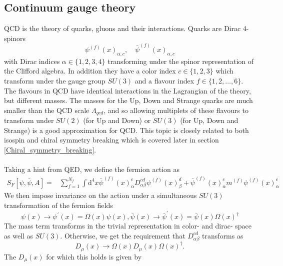 \documentclass[a4paper,10pt]{book}
\begin{document}
\subsection{Continuum gauge theory}
QCD is the theory of quarks, gluons and their interactions. Quarks are Dirac 4- spinors 
\begin{equation}
\psi^{(f)}(x)_{\alpha, c}, \quad \bar{\psi}^{(f)}(x)_{\alpha, c}
\end{equation}
with Dirac indices $\alpha \in \{ 1,2,3,4\}$ transforming under the spinor representation of the Clifford algebra. In addition they have a color index $c \in \{ 1,2,3\}$ which transform under the gauge group $SU(3)$ and a flavour index $f \in \{ 1,2,\ldots ,6\}$. The flavours in QCD have identical interactions in the Lagrangian of the theory, but different masses. The masses for the Up, Down and Strange quarks are much smaller than the QCD scale $\Lambda_{qcd}$, and so allowing multiplets of these flavours to transform under $SU(2)$ (for Up and Down) or $SU(3)$ (for Up, Down and Strange) is a good approximation for QCD. This topic is closely related to both isospin and chiral symmetry breaking which is covered later in section \ref{Chiral_symmetry_breaking}.\\\\Taking a hint from QED, we define the fermion action as
\begin{equation}
\begin{aligned}
S_{F}[\psi, \bar{\psi}, A]=& \sum_{f=1}^{N_{f}} \int \mathrm{d}^{4} x \bar{\psi}^{(f)}(x)_{\alpha}^cD_{\alpha \beta}^{c d} \psi^{(f)}(x)_{\beta}^d +
\bar{\psi}^{(f)}(x)_{\alpha}^c m^{(f)} \psi^{(f)}(x)_{\alpha}^c
\end{aligned}
\end{equation}
We then impose invariance on the action under a simultaneous $SU(3)$ transformation of the fermion fields
\begin{equation}
\psi(x) \rightarrow \psi^{\prime}(x)=\Omega(x) \psi(x), \bar{\psi}(x) \rightarrow \bar{\psi}^{\prime}(x)=\bar{\psi}(x) \Omega(x)^{\dagger}
\end{equation}
The mass term transforms in the trivial representation in color- and dirac- space as well as $SU(3)$. Otherwise, we get the requirement that $D_{\alpha \beta}^{c d}$ transforms as
\begin{equation}\label{eq:covariant_derivative_transformation}
D_{\mu}(x) \rightarrow \Omega(x) D_{\mu}(x) \Omega(x)^{\dagger}.
\end{equation}
The $D_{\mu}(x)$ for which this holds is given by 
\end{document}
